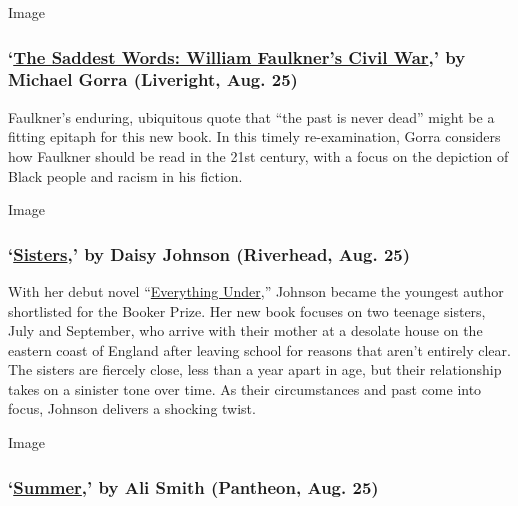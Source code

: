 Image

\hypertarget{the-saddest-words-william-faulkners-civil-war-by-michael-gorra-liveright-aug-25}{%
\subsubsection{\texorpdfstring{`\href{https://wwnorton.com/books/9781631491702}{The
Saddest Words: William Faulkner's Civil War},' by Michael Gorra
(Liveright, Aug.
25)}{`The Saddest Words: William Faulkner's Civil War,' by Michael Gorra (Liveright, Aug. 25)}}\label{the-saddest-words-william-faulkners-civil-war-by-michael-gorra-liveright-aug-25}}

Faulkner's enduring, ubiquitous quote that ``the past is never dead''
might be a fitting epitaph for this new book. In this timely
re-examination, Gorra considers how Faulkner should be read in the 21st
century, with a focus on the depiction of Black people and racism in his
fiction.

Image

\hypertarget{sisters-by-daisy-johnson-riverhead-aug-25}{%
\subsubsection{\texorpdfstring{`\href{https://www.penguinrandomhouse.com/books/624960/sisters-by-daisy-johnson/}{Sisters},'
by Daisy Johnson (Riverhead, Aug.
25)}{`Sisters,' by Daisy Johnson (Riverhead, Aug. 25)}}\label{sisters-by-daisy-johnson-riverhead-aug-25}}

With her debut novel
``\href{https://www.nytimes3xbfgragh.onion/2018/11/20/books/review/daisy-johnson-everything-under.html}{Everything
Under},'' Johnson became the youngest author shortlisted for the Booker
Prize. Her new book focuses on two teenage sisters, July and September,
who arrive with their mother at a desolate house on the eastern coast of
England after leaving school for reasons that aren't entirely clear. The
sisters are fiercely close, less than a year apart in age, but their
relationship takes on a sinister tone over time. As their circumstances
and past come into focus, Johnson delivers a shocking twist.

Image

\hypertarget{summer-by-ali-smith-pantheon-aug-25}{%
\subsubsection{\texorpdfstring{`\href{https://www.penguinrandomhouse.com/books/259057/summer-by-ali-smith/}{Summer},'
by Ali Smith (Pantheon, Aug.
25)}{`Summer,' by Ali Smith (Pantheon, Aug. 25)}}\label{summer-by-ali-smith-pantheon-aug-25}}

